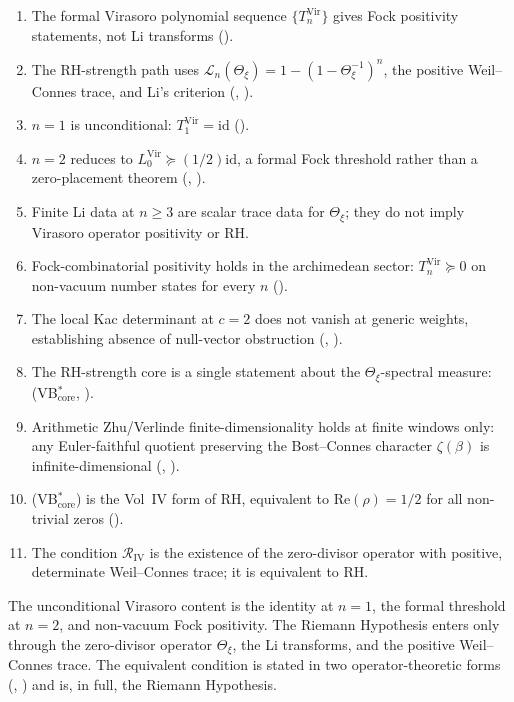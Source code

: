 \begin{enumerate}
\item The formal Virasoro polynomial sequence
\(\{T_{n}^{\mathrm{Vir}}\}\) gives Fock positivity statements, not
Li transforms
().
\item The RH-strength path uses
\(\mathcal L_n(\Theta_{\xi})=1-(1-\Theta_{\xi}^{-1})^n\), the
positive Weil--Connes trace, and Li's criterion
(,
).
\item \(n=1\) is unconditional:
\(T_{1}^{\mathrm{Vir}}=\mathrm{id}\)
().
\item \(n=2\) reduces to
\(L_{0}^{\mathrm{Vir}}\succeq(1/2)\mathrm{id}\), a formal Fock
threshold rather than a zero-placement theorem
(,
).
\item Finite Li data at \(n\geq 3\) are scalar trace data for
\(\Theta_{\xi}\); they do not imply Virasoro operator positivity or
RH.
\item Fock-combinatorial positivity holds in the archimedean sector:
\(T_{n}^{\mathrm{Vir}}\succeq 0\) on non-vacuum number states for every \(n\)
().
\item The local Kac determinant at \(c=2\) does not vanish at
generic weights, establishing absence of null-vector obstruction
(,
).
\item The RH-strength core is a single statement about the
\(\Theta_{\xi}\)-spectral measure: (VB\(^{*}_{\mathrm{core}}\),
).
\item Arithmetic Zhu/Verlinde finite-dimensionality holds at finite windows
only: any Euler-faithful quotient preserving the
Bost--Connes character \(\zeta(\beta)\) is infinite-dimensional
(,
).
\item (VB\(^{*}_{\mathrm{core}}\)) is the Vol~IV form of RH,
equivalent to
\(\mathrm{Re}(\rho)=1/2\) for all non-trivial zeros
().
\item The condition \(\mathcal{R}_{\mathrm{IV}}\) is the existence of
the zero-divisor operator with positive, determinate Weil--Connes trace; it
is equivalent to RH.
\end{enumerate}

The unconditional Virasoro content is the identity at \(n=1\), the
formal threshold at \(n=2\), and non-vacuum Fock positivity. The
Riemann Hypothesis enters only through the zero-divisor operator
\(\Theta_{\xi}\), the Li transforms, and the positive Weil--Connes
trace. The equivalent condition is stated in two
operator-theoretic forms
(,
) and is, in full, the Riemann
Hypothesis.
